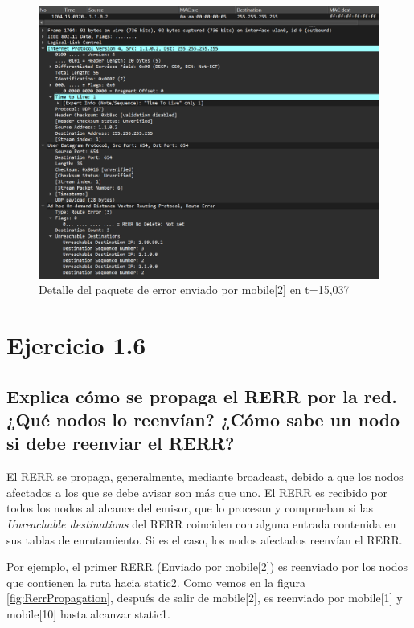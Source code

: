 \begin{figure}[H]
    \centering
    \includegraphics[width=125mm, scale=0.75]{imaxes/aodv/ejercicio5_1.png}
    \caption{Detalle del paquete de error enviado por mobile[2] en t=15,037}
    \label{fig:RerrWireshark}
\end{figure}

\vspace{1.25cm}
\section{Ejercicio 1.6}

\subsection{Explica cómo se propaga el RERR por la red. ¿Qué nodos lo reenvían? ¿Cómo sabe un nodo si debe reenviar
el RERR?}

El RERR se propaga, generalmente, mediante broadcast, debido a que los nodos afectados a los que se debe avisar son más que uno. El RERR es recibido por todos los nodos al alcance del emisor, que lo procesan y comprueban si las \textit{Unreachable destinations} del RERR coinciden con alguna entrada contenida en sus tablas de enrutamiento. Si es el caso, los nodos afectados reenvían el RERR.

Por ejemplo, el primer RERR (Enviado por mobile[2]) es reenviado por los nodos que contienen la ruta hacia static2. Como vemos en la figura \ref{fig:RerrPropagation}, después de salir de mobile[2], es reenviado por mobile[1] y mobile[10] hasta alcanzar static1.

